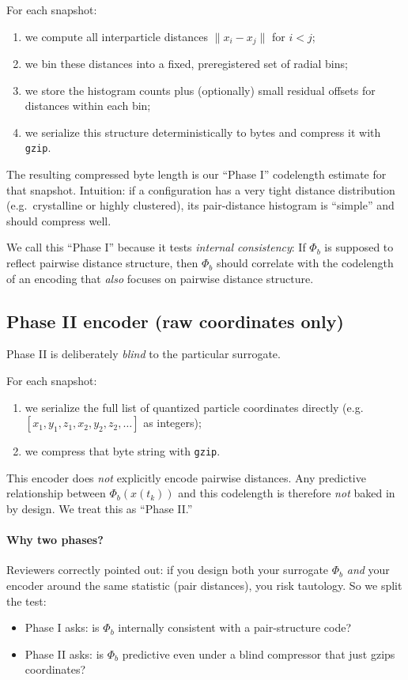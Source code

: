 \documentclass[11pt,a4paper]{article}
\numberwithin{equation}{section}
\newcommand{\norm}[1]{\lVert #1\rVert}
\newcommand{\phib}{\Phi_b}
\begin{document}
For each snapshot:
\begin{enumerate}[label=(\alph*)]
\item we compute all interparticle distances $\norm{x_i - x_j}$ for $i<j$;
\item we bin these distances into a fixed, preregistered set of radial bins;
\item we store the histogram counts plus (optionally) small residual offsets for distances within each bin;
\item we serialize this structure deterministically to bytes and compress it with \texttt{gzip}.
\end{enumerate}

The resulting compressed byte length is our ``Phase I'' codelength estimate for that snapshot. Intuition: if a configuration has a very tight distance distribution (e.g.\ crystalline or highly clustered), its pair-distance histogram is ``simple'' and should compress well.

We call this ``Phase I'' because it tests \emph{internal consistency}: If $\phib$ is supposed to reflect pairwise distance structure, then $\phib$ should correlate with the codelength of an encoding that \emph{also} focuses on pairwise distance structure.

\subsection{Phase II encoder (raw coordinates only)}
\label{sec:phase2}
Phase II is deliberately \emph{blind} to the particular surrogate.

For each snapshot:
\begin{enumerate}[label=(\alph*)]
\item we serialize the full list of quantized particle coordinates directly (e.g.\ $[x_1,y_1,z_1,x_2,y_2,z_2,\dots]$ as integers);
\item we compress that byte string with \texttt{gzip}.
\end{enumerate}

This encoder does \emph{not} explicitly encode pairwise distances. Any predictive relationship between $\phib(x(t_k))$ and this codelength is therefore \emph{not} baked in by design. We treat this as ``Phase II.''

\paragraph{Why two phases?}
Reviewers correctly pointed out: if you design both your surrogate $\phib$ \emph{and} your encoder around the same statistic (pair distances), you risk tautology. So we split the test:
\begin{itemize}
\item Phase I asks: is $\phib$ internally consistent with a pair-structure code?
\item Phase II asks: is $\phib$ predictive even under a blind compressor that just gzips coordinates?
\end{itemize}
\end{document}
